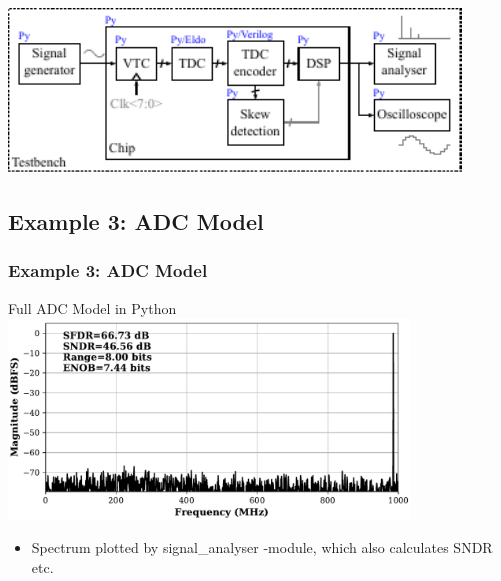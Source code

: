 \documentclass{sdkslides}
\begin{document}
\subsection*{\sectionname} 
\begin{frame}[c]
    \frametitle{\sectionname}
    \begin{center}
        \includegraphics[width=0.9\textwidth]{Pics/sdk_model_2}
    \end{center}
\end{frame}

\renewcommand{\sectionname}{Example 3: ADC Model}
\subsection*{\sectionname} 
\begin{frame}[c]
    \frametitle{\sectionname}
    \begin{center}
        Full ADC Model in Python
        \includegraphics[width=0.8\textwidth]{Pics/latido_fft_py}
    \end{center}
    \begin{itemize}
        \item Spectrum plotted by signal\_analyser -module, which also
            calculates SNDR etc.
    \end{itemize}
\end{frame}

\renewcommand{\sectionname}{Example 3: ADC Model}
\end{document}

